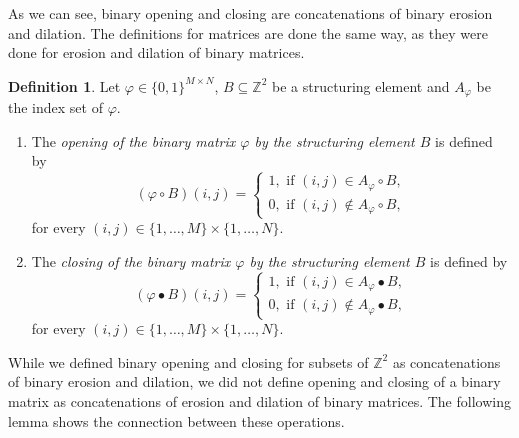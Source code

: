\documentclass[a4paper,12pt]{article}
\theoremstyle{plain}
\theoremstyle{definition}
\newtheorem{definition}[theorem]{Definition}
\theoremstyle{remark}
\begin{document}
As we can see, binary opening and closing are concatenations of binary erosion and dilation. The definitions for matrices are done the same way, as they were done for erosion and dilation of binary matrices.

\begin{definition}
	Let $\varphi \in \{ 0, 1 \}^{M \times N}$, $B \subseteq \mathbb{Z}^2$ be a structuring element and $A_\varphi$ be the index set of $\varphi$.
	\begin{enumerate}
		\item The \emph{opening of the binary matrix $\varphi$ by the structuring element $B$} is defined by
		\begin{equation}
			(\varphi \circ B)(i, j) =
			\begin{cases}
				1, \textrm{ if } (i, j) \in A_\varphi \circ B, \\
				0, \textrm{ if } (i, j) \notin A_\varphi \circ B,
			\end{cases}
		\end{equation}
		for every $(i, j) \in \{ 1, \dots, M \} \times \{ 1, \dots, N \}$.
		\item The \emph{closing of the binary matrix $\varphi$ by the structuring element $B$} is defined by
		\begin{equation}
			(\varphi \bullet B)(i, j) =
			\begin{cases}
				1, \textrm{ if } (i, j) \in A_\varphi \bullet B, \\
				0, \textrm{ if } (i, j) \notin A_\varphi \bullet B,
			\end{cases}
		\end{equation}
		for every $(i, j) \in \{ 1, \dots, M \} \times \{ 1, \dots, N \}$.
	\end{enumerate}
\end{definition}

While we defined binary opening and closing for subsets of $\mathbb{Z}^2$ as concatenations of binary erosion and dilation, we did not define opening and closing of a binary matrix as concatenations of erosion and dilation of binary matrices. The following lemma shows the connection between these operations.
\end{document}
